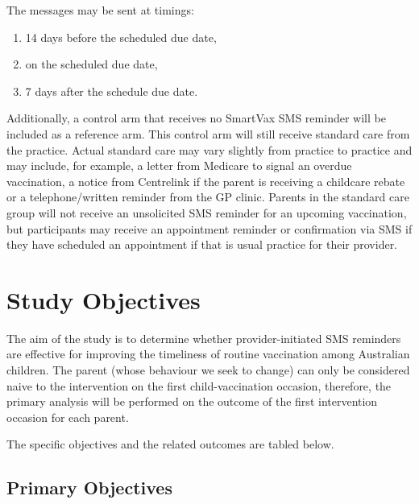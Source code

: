 \documentclass[
  bibliography=totoc]{scrreprt}
\providecommand{\tightlist}{%
  \setlength{\itemsep}{0pt}\setlength{\parskip}{0pt}}
\begin{document}
The messages may be sent at timings:

\begin{enumerate}
\def\labelenumi{\arabic{enumi}.}
\tightlist
\item
  14 days before the scheduled due date,
\item
  on the scheduled due date,
\item
  7 days after the schedule due date.
\end{enumerate}

Additionally, a control arm that receives no SmartVax SMS reminder will be included as a reference arm.
This control arm will still receive standard care from the practice.
Actual standard care may vary slightly from practice to practice and may include, for example, a letter from Medicare to signal an overdue vaccination, a notice from Centrelink if the parent is receiving a childcare rebate or a telephone/written reminder from the GP clinic.
Parents in the standard care group will not receive an unsolicited SMS reminder for an upcoming vaccination, but participants may receive an appointment reminder or confirmation via SMS if they have scheduled an appointment if that is usual practice for their provider.

\hypertarget{study-objectives}{%
\section{Study Objectives}\label{study-objectives}}

The aim of the study is to determine whether provider-initiated SMS reminders are effective for improving the timeliness of routine vaccination among Australian children.
The parent (whose behaviour we seek to change) can only be considered naive to the intervention on the first child-vaccination occasion, therefore, the primary analysis will be performed on the outcome of the first intervention occasion for each parent.

The specific objectives and the related outcomes are tabled below.

\hypertarget{primary-objectives}{%
\subsection{Primary Objectives}\label{primary-objectives}}

\begingroup\fontsize{10}{12}\selectfont
\end{document}
